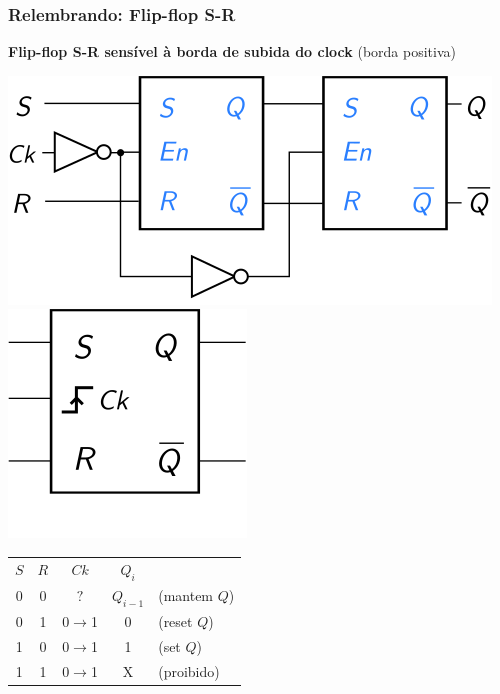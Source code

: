 \documentclass{beamer}
\begin{document}
\begin{frame}
\frametitle{Relembrando: Flip-flop S-R}

\textbf{Flip-flop S-R sensível à borda de subida do clock} (borda positiva)

\begin{center}
\includegraphics{images/flipflopRSpos_circuit}
\hspace{2ex}
\raisebox{50pt}{\Huge$=$}
\hspace{2ex}
\includegraphics{images/flipflopRSpos_blackbox}

\vspace{12pt}

\begin{tabular}{ccc||cl}
$S$ & $R$ &        $Ck$       & $Q_i$ \\
\cline{1-4}
 0  &  0  &        $?$        & $Q_{i-1}$  & (mantem $Q$) \\
 0  &  1  &  0$\rightarrow$1  &     0      & (reset $Q$) \\
 1  &  0  &  0$\rightarrow$1  &     1      & (set $Q$) \\
 1  &  1  &  0$\rightarrow$1  &     X  & (proibido) \\
\end{tabular}
\end{center}

\end{frame}
\end{document}
